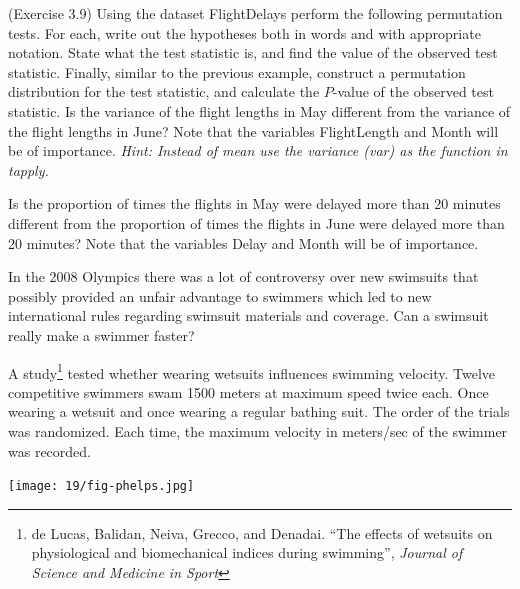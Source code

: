 \clearpage


\bb[resume]
\ii (Exercise 3.9) Using the dataset FlightDelays perform the following permutation tests. For each, write out the hypotheses both in
words and with appropriate notation. State what the test statistic is, and find the value of the observed test statistic. Finally, similar to the previous example, construct a permutation distribution for the test statistic, and calculate the $P$-value of the observed test statistic.
\bb
\ii Is the variance of the flight lengths in May different from the variance of the flight lengths in June? Note that the variables FlightLength and Month will be of importance. \textit{Hint: Instead of mean use the variance (var) as the function in tapply.}

\vfill

\ii Is the proportion of times the flights in May were delayed more than 20 minutes different from the proportion of times the flights in June were delayed more than 20 minutes? Note that the variables Delay and Month will be of importance.

\vfill

\ee
\ee


\begin{multicols}{2}

In the 2008 Olympics there was a lot of controversy over new swimsuits that possibly provided an unfair advantage to swimmers
which led to new international rules regarding swimsuit materials and coverage. Can a swimsuit really make a swimmer faster?

\medskip

A study\footnote{de Lucas, Balidan, Neiva, Grecco, and Denadai. ``The effects of wetsuits on physiological and biomechanical indices during swimming'', \textit{Journal of Science and Medicine in Sport}} tested whether wearing wetsuits influences swimming velocity. Twelve competitive swimmers swam 1500 meters at maximum speed twice each. Once wearing a wetsuit and once wearing a regular bathing suit. The order of the trials was randomized. Each time, the maximum velocity in meters/sec of the swimmer was recorded.

\columnbreak

\texttt{[image: 19/fig-phelps.jpg]}

\end{multicols}

